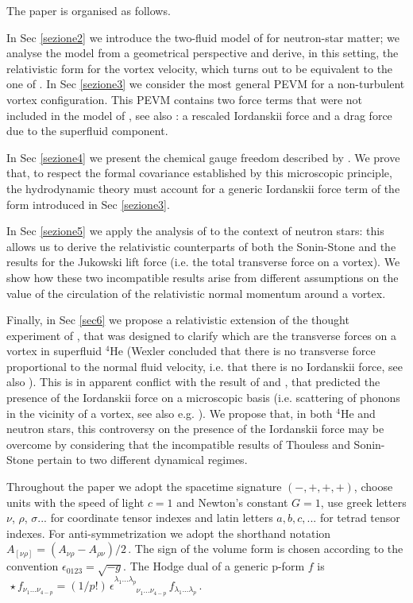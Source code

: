 \documentclass[preprints,article,accept,moreauthors,pdftex]{mdpi}
\begin{document}
 
The paper is organised as follows. 
 
In Sec \ref{sezione2} we introduce the two-fluid model of \citet{langlois98} for neutron-star matter; we analyse the model from a geometrical perspective and  derive, in this setting, the relativistic form for the vortex velocity, which turns out to be equivalent to  the one of \citet{GusakovHVBK}.
%
In Sec \ref{sezione3} we consider the most general PEVM  for a non-turbulent vortex configuration. 
This PEVM contains two force terms that were not included in the model of \citet{langlois98}, see also \cite{Andersson_Mutual_Friction_2016,GavassinoGeometria}: a  rescaled Iordanskii force and a drag force due to the superfluid component.

In Sec \ref{sezione4} we present the chemical gauge freedom described by \citet{carter_macro_2006}. 
We prove that, to respect the formal covariance established by this microscopic principle, the hydrodynamic theory must account for a generic Iordanskii force term of the form introduced in Sec \ref{sezione3}.
 
In Sec \ref{sezione5} we apply the analysis of \citet{Carter_Prix_Magnus} to the context of neutron stars: this allows us to derive the relativistic counterparts of both the Sonin-Stone \cite{sonin1997PhRvB,stone2000,sonin_book_2016} and the \citet{Thouless2001} results for the Jukowski lift force (i.e. the total transverse force on a vortex). We show how these two incompatible results arise from different assumptions on the value of the circulation of the relativistic normal momentum around a vortex.
 
Finally, in Sec \ref{sec6} we propose a relativistic extension of the thought experiment of \citet{Wexler1997}, that was designed to clarify which are the transverse forces on a vortex in  superfluid $^4$He (Wexler concluded that there is no transverse force proportional to the normal fluid velocity, i.e. that there is no Iordanskii force, see also \cite{geller2000}). 
This is in apparent conflict with the result of \citet{sonin1997PhRvB}  and  \citet{stone2000}, that predicted the presence of the Iordanskii force on a microscopic basis (i.e. scattering of phonons in the vicinity of a vortex, see also e.g. \cite{sonin_book_2016}). We propose that, in both $^4$He and neutron stars, this controversy on the presence of the Iordanskii force may be overcome by considering that the incompatible results of Thouless  and Sonin-Stone pertain to two different dynamical regimes.

Throughout the paper we adopt the spacetime signature $ ( - , +, + , + ) $, choose units with the speed of light $c=1$ and Newton's constant $G=1$, use greek letters $\nu$, $\rho$, $\sigma$... for coordinate tensor indexes and 
latin letters $a,b,c,...$ for tetrad tensor indexes.
  For anti-symmetrization we adopt the shorthand notation $A_{[\nu \rho]}= (A_{\nu \rho} - A_{\rho \nu})/2 \, $. 
The sign of the volume form is chosen according to the convention $\epsilon_{0123} = \sqrt{-g}$.
The Hodge dual of a generic p-form $f$ 
is~$ \, {\star} f_{\nu_1 ... \nu_{4-p} } = 
(1/p!) \, \epsilon^{ \lambda_1 ... \lambda_p }_{\phantom{\lambda_1 ... \lambda_p}\nu_1 ... \nu_{4-p}} 
\, f_{\lambda_1 ... \lambda_p} \,$.
\end{document}
